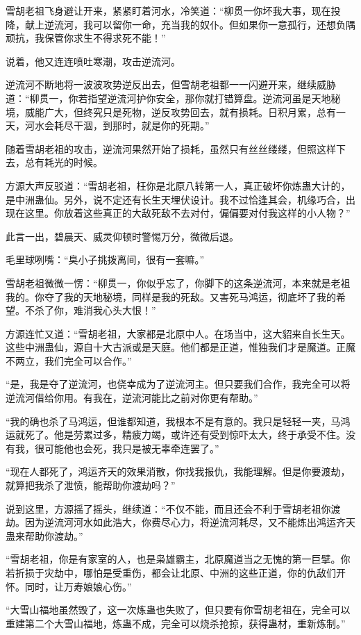 \begin{this_body}
雪胡老祖飞身避让开来，紧紧盯着河水，冷笑道：“柳贯一你坏我大事，现在投降，献上逆流河，我可以留你一命，充当我的奴仆。但如果你一意孤行，还想负隅顽抗，我保管你求生不得求死不能！”

说着，他又连连喷吐寒潮，攻击逆流河。

逆流河不断地将一波波攻势逆反出去，但雪胡老祖都一一闪避开来，继续威胁道：“柳贯一，你若指望逆流河护你安全，那你就打错算盘。逆流河虽是天地秘境，威能广大，但终究只是死物，逆反攻势回去，就有损耗。日积月累，总有一天，河水会耗尽干涸，到那时，就是你的死期。”

随着雪胡老祖的攻击，逆流河果然开始了损耗，虽然只有丝丝缕缕，但照这样下去，总有耗光的时候。

方源大声反驳道：“雪胡老祖，枉你是北原八转第一人，真正破坏你炼蛊大计的，是中洲蛊仙。另外，说不定还有长生天埋伏设计。我不过恰逢其会，机缘巧合，出现在这里。你放着这些真正的大敌死敌不去对付，偏偏要对付我这样的小人物？”

此言一出，碧晨天、威灵仰顿时警惕万分，微微后退。

毛里球咧嘴：“臭小子挑拨离间，很有一套嘛。”

雪胡老祖微微一愣：“柳贯一，你似乎忘了，你脚下的这条逆流河，本来就是老祖我的。你夺了我的天地秘境，同样是我的死敌。又害死马鸿运，彻底坏了我的希望。不杀了你，难消我心头大恨！”

方源连忙又道：“雪胡老祖，大家都是北原中人。在场当中，这大貂来自长生天。这些中洲蛊仙，源自十大古派或是天庭。他们都是正道，惟独我们才是魔道。正魔不两立，我们完全可以合作。”

“是，我是夺了逆流河，也侥幸成为了逆流河主。但只要我们合作，我完全可以将逆流河借给你用。有我在，逆流河能比之前对你更有帮助。”

“我的确也杀了马鸿运，但谁都知道，我根本不是有意的。我只是轻轻一夹，马鸿运就死了。他是劳累过多，精疲力竭，或许还有受到惊吓太大，终于承受不住。没有我，很可能他也会死，我只是被无辜牵连罢了。”

“现在人都死了，鸿运齐天的效果消散，你找我报仇，我能理解。但是你要渡劫，就算把我杀了泄愤，能帮助你渡劫吗？”

说到这里，方源摇了摇头，继续道：“不仅不能，而且还会不利于雪胡老祖你渡劫。因为逆流河河水如此浩大，你费尽心力，将逆流河耗尽，又不能炼出鸿运齐天蛊来帮助你渡劫。”

“雪胡老祖，你是有家室的人，也是枭雄霸主，北原魔道当之无愧的第一巨擘。你若折损于灾劫中，哪怕是受重伤，都会让北原、中洲的这些正道，你的仇敌们开怀。同时，让万寿娘娘心伤。”

“大雪山福地虽然毁了，这一次炼蛊也失败了，但只要有你雪胡老祖在，完全可以重建第二个大雪山福地，炼蛊不成，完全可以烧杀抢掠，获得蛊材，重新炼制。”


\end{this_body}
